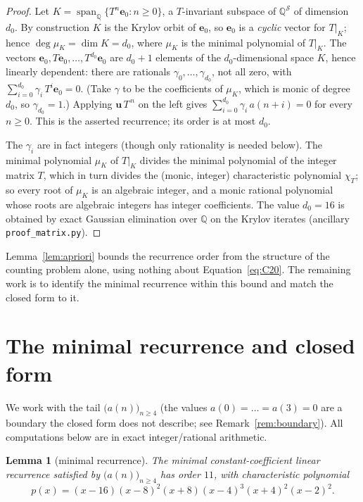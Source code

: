 \documentclass[11pt]{article}
\newtheorem{lemma}[theorem]{Lemma}
\theoremstyle{definition}
\begin{document}
\begin{proof}
Let $K=\operatorname{span}_{\mathbb Q}\{T^n\mathbf e_0:n\ge0\}$, a $T$-invariant subspace of
$\mathbb Q^{\mathcal S}$ of dimension $d_0$. By construction $K$ is the Krylov orbit of
$\mathbf e_0$, so $\mathbf e_0$ is a \emph{cyclic} vector for $T|_K$; hence
$\deg\mu_K=\dim K=d_0$, where $\mu_K$ is the minimal polynomial of $T|_K$. The vectors
$\mathbf e_0,T\mathbf e_0,\dots,T^{d_0}\mathbf e_0$ are $d_0+1$ elements of the
$d_0$-dimensional space $K$, hence linearly dependent: there are rationals
$\gamma_0,\dots,\gamma_{d_0}$, not all zero, with $\sum_{i=0}^{d_0}\gamma_i\,T^{i}\mathbf e_0=0$.
(Take $\gamma$ to be the coefficients of $\mu_K$, which is monic of degree $d_0$, so
$\gamma_{d_0}=1$.) Applying
$\mathbf u\,T^{\,n}$ on the left gives $\sum_{i=0}^{d_0}\gamma_i\,a(n+i)=0$ for every $n\ge0$.
This is the asserted recurrence; its order is at most $d_0$.

The $\gamma_i$ are in fact integers (though only rationality is needed below). The minimal
polynomial $\mu_K$ of $T|_K$ divides the minimal polynomial of the integer matrix $T$, which in
turn divides the (monic, integer) characteristic polynomial $\chi_T$; so every root of $\mu_K$
is an algebraic integer, and a monic rational polynomial whose roots are algebraic integers has
integer coefficients. The value $d_0=16$ is obtained by exact Gaussian elimination over
$\mathbb Q$ on the Krylov iterates (ancillary \texttt{proof\_matrix.py}).
\end{proof}

Lemma~\ref{lem:apriori} bounds the recurrence order from the structure of the counting problem
alone, using nothing about Equation~\eqref{eq:C20}. The remaining work is to identify the
minimal recurrence within this bound and match the closed form to it.

\section{The minimal recurrence and closed form}\label{sec:proof}

We work with the tail $\bigl(a(n)\bigr)_{n\ge4}$ (the values $a(0)=\dots=a(3)=0$ are a
boundary the closed form does not describe; see Remark~\ref{rem:boundary}). All computations
below are in exact integer/rational arithmetic.

\begin{lemma}[minimal recurrence]\label{lem:min}
The minimal constant-coefficient linear recurrence satisfied by $\bigl(a(n)\bigr)_{n\ge4}$
has order $11$, with characteristic polynomial
\begin{equation}\label{eq:charpoly}
  p(x)=(x-16)(x-8)^2(x+8)(x-4)^3(x+4)^2(x-2)^2 .
\end{equation}
\end{lemma}
\end{document}
